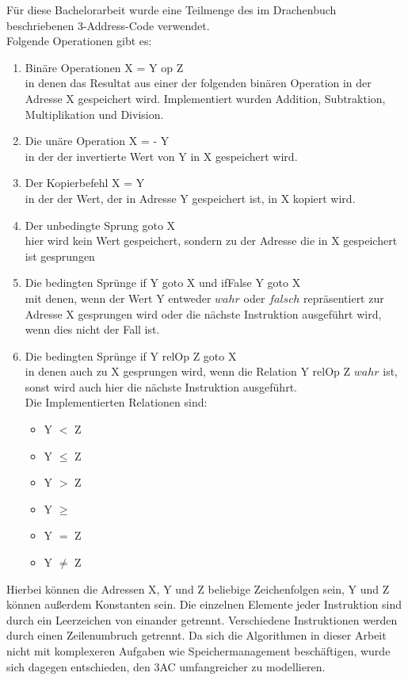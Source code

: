 Für diese Bachelorarbeit wurde eine Teilmenge des im Drachenbuch \cite[Kapitel 6.2.1]{D}
beschriebenen 3-Address-Code verwendet.\\
Folgende Operationen gibt es:
\begin{enumerate}
  \item Binäre Operationen X = Y op Z\\
    in denen das Resultat aus einer der folgenden binären Operation
    in der Adresse X gespeichert wird. Implementiert wurden Addition, 
    Subtraktion, Multiplikation und Division.
  \item Die unäre Operation X = - Y\\
    in der der invertierte Wert von Y in X gespeichert wird.
  \item Der Kopierbefehl X = Y\\
    in der der Wert, der in Adresse Y gespeichert ist, in X kopiert wird.
  \item Der unbedingte Sprung goto X\\
    hier wird kein Wert gespeichert, sondern zu der Adresse die in X gespeichert ist gesprungen
  \item Die bedingten Sprünge if Y goto X und ifFalse Y goto X\\
    mit denen, wenn der Wert Y entweder $wahr$ oder $falsch$ repräsentiert 
    zur Adresse X gesprungen wird  
    oder die nächste Instruktion ausgeführt wird, wenn dies nicht der Fall ist.
  \item Die bedingten Sprünge if Y relOp Z goto X\\
    in denen auch zu X gesprungen wird, wenn die Relation Y relOp Z $wahr$ ist, 
    sonst wird auch hier die nächste Instruktion ausgeführt.\\
    Die Implementierten Relationen sind: 
    \begin{itemize}
      \item Y $<$ Z
      \item Y $\leq$ Z
      \item Y $>$ Z
      \item Y $\geq$ 
      \item Y $=$ Z
      \item Y $\neq$ Z
    \end{itemize}
\end{enumerate}

Hierbei können die Adressen X, Y und Z beliebige Zeichenfolgen sein, 
Y und Z können außerdem Konstanten sein.
Die einzelnen Elemente jeder Instruktion sind durch ein Leerzeichen von einander
getrennt. Verschiedene Instruktionen werden durch einen Zeilenumbruch getrennt.
Da sich die Algorithmen in dieser Arbeit nicht mit komplexeren Aufgaben wie
Speichermanagement beschäftigen, wurde sich dagegen entschieden, den 3AC
umfangreicher zu modellieren.\\

